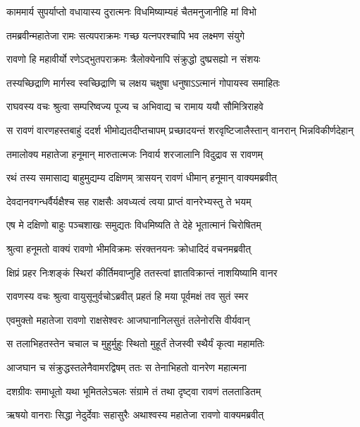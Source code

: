 \twolineshloka
{काममार्य सुपर्याप्तो वधायास्य दुरात्मनः}
{विधमिष्याम्यहं चैतमनुजानीहि मां विभो} %

\twolineshloka
{तमब्रवीन्महातेजा रामः सत्यपराक्रमः}
{गच्छ यत्नपरश्चापि भव लक्ष्मण संयुगे} %

\twolineshloka
{रावणो हि महावीर्यो रणेऽद्भुतपराक्रमः}
{त्रैलोक्येनापि संक्रुद्धो दुष्प्रसह्यो न संशयः} %

\twolineshloka
{तस्यच्छिद्राणि मार्गस्व स्वच्छिद्राणि च लक्षय}
{चक्षुषा धनुषाऽऽत्मानं गोपायस्व समाहितः} %

\twolineshloka
{राघवस्य वचः श्रुत्वा सम्परिष्वज्य पूज्य च}
{अभिवाद्य च रामाय ययौ सौमित्रिराहवे} %

\twolineshloka
{स रावणं वारणहस्तबाहुं ददर्श भीमोद्यतदीप्तचापम्}
{प्रच्छादयन्तं शरवृष्टिजालैस्तान् वानरान् भिन्नविकीर्णदेहान्} %

\twolineshloka
{तमालोक्य महातेजा हनूमान् मारुतात्मजः}
{निवार्य शरजालानि विदुद्राव स रावणम्} %

\twolineshloka
{रथं तस्य समासाद्य बाहुमुद्यम्य दक्षिणम्}
{त्रासयन् रावणं धीमान् हनूमान् वाक्यमब्रवीत्} %

\twolineshloka
{देवदानवगन्धर्वैर्यक्षैश्च सह राक्षसैः}
{अवध्यत्वं त्वया प्राप्तं वानरेभ्यस्तु ते भयम्} %

\twolineshloka
{एष मे दक्षिणो बाहुः पञ्चशाखः समुद्यतः}
{विधमिष्यति ते देहे भूतात्मानं चिरोषितम्} %

\twolineshloka
{श्रुत्वा हनूमतो वाक्यं रावणो भीमविक्रमः}
{संरक्तनयनः क्रोधादिदं वचनमब्रवीत्} %

\twolineshloka
{क्षिप्रं प्रहर निःशङ्कं स्थिरां कीर्तिमवाप्नुहि}
{ततस्त्वां ज्ञातविक्रान्तं नाशयिष्यामि वानर} %

\twolineshloka
{रावणस्य वचः श्रुत्वा वायुसूनुर्वचोऽब्रवीत्}
{प्रहतं हि मया पूर्वमक्षं तव सुतं स्मर} %

\twolineshloka
{एवमुक्तो महातेजा रावणो राक्षसेश्वरः}
{आजघानानिलसुतं तलेनोरसि वीर्यवान्} %

\twolineshloka
{स तलाभिहतस्तेन चचाल च मुहुर्मुहुः}
{स्थितो मुहूर्तं तेजस्वी स्थैर्यं कृत्वा महामतिः} %

\twolineshloka
{आजघान च संक्रुद्धस्तलेनैवामरद्विषम्}
{ततः स तेनाभिहतो वानरेण महात्मना} %

\twolineshloka
{दशग्रीवः समाधूतो यथा भूमितलेऽचलः}
{संग्रामे तं तथा दृष्ट्वा रावणं तलताडितम्} %

\twolineshloka
{ऋषयो वानराः सिद्धा नेदुर्देवाः सहासुरैः}
{अथाश्वस्य महातेजा रावणो वाक्यमब्रवीत्} %

